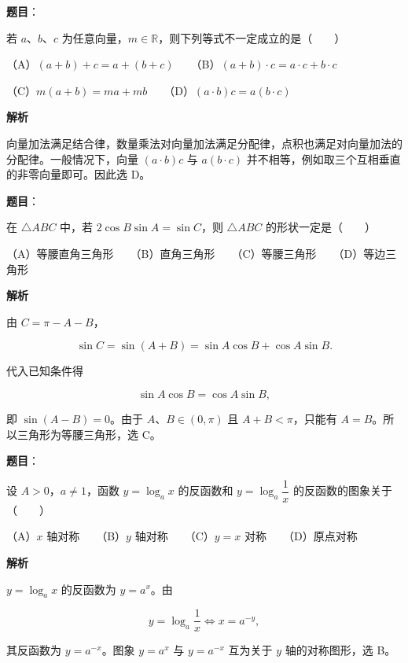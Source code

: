 \begin{answer}

\textbf{题目}：

若 $a\text{、}b\text{、}c$ 为任意向量，$m\in\mathbb R$，则下列等式不一定成立的是\mbox{（　　）}

（A）$(a+b)+c=a+(b+c)$　　（B）$(a+b)\cdot c=a\cdot c+b\cdot c$

（C）$m(a+b)=ma+mb$　　（D）$(a\cdot b)c=a(b\cdot c)$

\textbf{解析}

向量加法满足结合律，数量乘法对向量加法满足分配律，点积也满足对向量加法的分配律。一般情况下，向量 $(a\cdot b)c$ 与 $a(b\cdot c)$ 并不相等，例如取三个互相垂直的非零向量即可。因此选 D。


\end{answer}
\begin{answer}

\textbf{题目}：

在 $\triangle ABC$ 中，若 $2\cos B\sin A=\sin C$，则 $\triangle ABC$ 的形状一定是\mbox{（　　）}

（A）等腰直角三角形　　（B）直角三角形　　（C）等腰三角形　　（D）等边三角形

\textbf{解析}

由 $C=\pi-A-B$，

\nopagebreak[4]
\[
\sin C=\sin(A+B)=\sin A\cos B+\cos A\sin B.
\]

代入已知条件得

\nopagebreak[4]
\[
\sin A\cos B=\cos A\sin B,
\]

即 $\sin(A-B)=0$。由于 $A\text{、}B\in(0,\pi)$ 且 $A+B<\pi$，只能有 $A=B$。所以三角形为等腰三角形，选 C。


\end{answer}
\begin{answer}

\textbf{题目}：

设 $A>0$，$a\ne1$，函数 $y=\log_a x$ 的反函数和 $y=\log_a\dfrac1x$ 的反函数的图象关于\mbox{（　　）}

（A）$x$ 轴对称　　（B）$y$ 轴对称　　（C）$y=x$ 对称　　（D）原点对称

\textbf{解析}

$y=\log_a x$ 的反函数为 $y=a^x$。由

\nopagebreak[4]
\[
y=\log_a\frac1x
\Longleftrightarrow
x=a^{-y},
\]

其反函数为 $y=a^{-x}$。图象 $y=a^x$ 与 $y=a^{-x}$ 互为关于 $y$ 轴的对称图形，选 B。


\end{answer}
